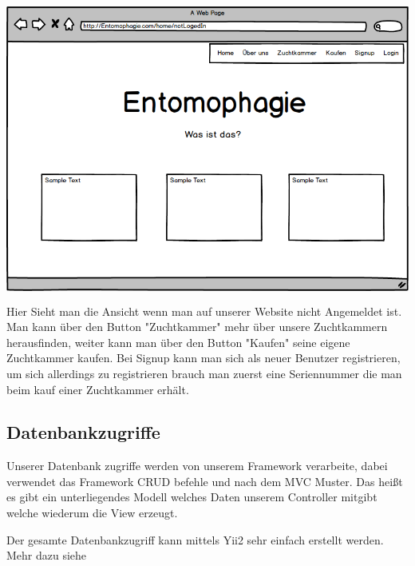 \includegraphics[height=10cm]{figures/NotlogedIN}
Hier Sieht man die Ansicht wenn man auf unserer Website nicht Angemeldet ist. Man kann über den Button "Zuchtkammer" mehr über unsere Zuchtkammern herausfinden, weiter kann man über den Button "Kaufen" seine eigene Zuchtkammer kaufen. Bei Signup kann man sich als neuer Benutzer registrieren, um sich allerdings zu registrieren brauch man zuerst eine Seriennummer die man beim kauf einer Zuchtkammer erhält.
\newpage

\subsection{Datenbankzugriffe}
Unserer Datenbank zugriffe werden von unserem Framework verarbeite, dabei verwendet das Framework CRUD befehle und nach dem MVC Muster. Das heißt es gibt ein unterliegendes Modell welches Daten unserem Controller mitgibt welche wiederum die View erzeugt.

Der gesamte Datenbankzugriff kann mittels Yii2 sehr einfach erstellt werden. Mehr dazu siehe 